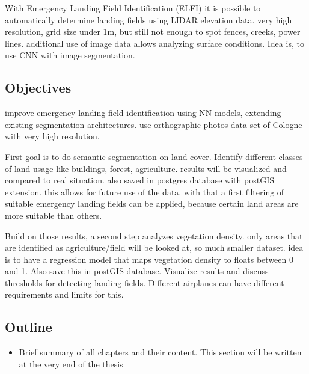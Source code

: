 With Emergency Landing Field Identification (ELFI) it is possible to automatically determine landing fields using LIDAR elevation data. very high resolution, grid size under 1m, but still not enough to spot fences, creeks, power lines. additional use of image data allows analyzing surface conditions. Idea is, to use CNN with image segmentation.

\subsection{Objectives}
improve emergency landing field identification using NN models, extending existing segmentation architectures. use orthographic photos data set of Cologne with very high resolution.

First goal is to do semantic segmentation on land cover. Identify different classes of land usage like buildings, forest, agriculture. results will be visualized and compared to real situation. also saved in postgres database with postGIS extension. this allows for future use of the data. with that a first filtering of suitable emergency landing fields can be applied, because certain land areas are more suitable than others.

Build on those results, a second step analyzes vegetation density. only areas that are identified as  agriculture/field will be looked at, so much smaller dataset. idea is to have a regression model that maps vegetation density to floats between 0 and 1. Also save this in postGIS database. Visualize results and discuss thresholds for detecting landing fields. Different airplanes can have different requirements and limits for this.

\subsection{Outline}

\begin{itemize}
    \item Brief summary of all chapters and their content. This section will be written at the very end of the thesis
\end{itemize}

\newpage